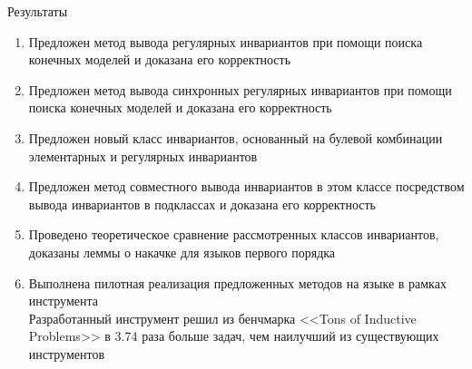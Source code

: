 \begin{frame}{Результаты}
\begin{enumerate}
\item Предложен метод вывода регулярных инвариантов при помощи поиска конечных моделей и доказана его корректность
\item Предложен метод вывода синхронных регулярных инвариантов при помощи поиска конечных моделей и доказана его корректность
\item Предложен новый класс инвариантов, основанный на булевой комбинации элементарных и регулярных инвариантов
\item Предложен метод совместного вывода инвариантов в этом классе посредством вывода инвариантов в подклассах и доказана его корректность
\item Проведено теоретическое сравнение рассмотренных классов инвариантов, доказаны леммы о накачке для языков первого порядка
\item Выполнена пилотная реализация предложенных методов на языке \fsharp{} в рамках инструмента \theringen{}\\Разработанный инструмент решил из бенчмарка <<Tons of Inductive Problems>> в 3.74 раза больше задач, чем наилучший из существующих инструментов
\end{enumerate}
\end{frame}
